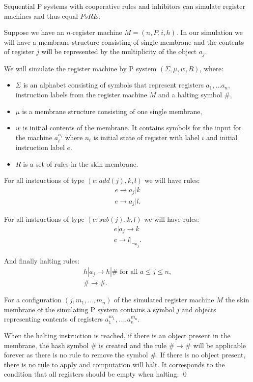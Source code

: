 \begin{veta}
  Sequential P systems with cooperative rules and inhibitors can simulate register machines and thus equal $PsRE$.
\end{veta}


\begin{dokaz}
\label{proof:reg_by_inh}
  Suppose we have an $n$-register machine $M = (n,P,i,h)$. In our simulation we will have a membrane structure consisting of single membrane and the contents of register $j$ will be represented by the multiplicity of the object $a_j$.

  We will simulate the register machine by P system $(\Sigma, \mu, w, R)$, where:
  \begin{itemize}
    \item $\Sigma$ is an alphabet consisting of symbols that represent registers $a_1,\dots a_n$, instruction labels from the register machine $M$ and a halting symbol $\#$,
    \item $\mu$ is a membrane structure consisting of one single membrane,
    \item $w$ is initial contents of the membrane. It contains symbols for the input for the machine $a_i^{n_i}$ where $n_i$ is initial state of register with label $i$ and initial instruction label $e$.
    \item $R$ is a set of rules in the skin membrane.
  \end{itemize}
    
  For all instructions of type $(e : add(j), k, l)$ we will have rules:
  \begin{align*}
    e \rightarrow a_j|k\\
    e \rightarrow a_j|l.
  \end{align*}

  For all instructions of type $(e : sub(j), k, l)$ we will have rules:
  \begin{align*}
    e|a_j \rightarrow k\\
    e \rightarrow l|_{\neg a_j}.
  \end{align*}

  And finally halting rules:
  \begin{align*}
    h|a_j \rightarrow h|\#\text{~for all~}a\leq j\leq n,\\
    \# \rightarrow \#.
  \end{align*}

  For a configuration $(j, m_1, \dots, m_n)$ of the simulated register machine $M$ the skin membrane of the simulating P system contains a symbol $j$ and objects representing contents of registers $a_1^{m_1}, \dots, a_n^{m_n}$.

  When the halting instruction is reached, if there is an object present in the membrane, the hash symbol $\#$ is created and the rule $\# \rightarrow \#$ will be applicable forever as there is no rule to remove the symbol $\#$. If there is no object present, there is no rule to apply and computation will halt. It corresponds to the condition that all registers should be empty when halting. \qed
\end{dokaz}